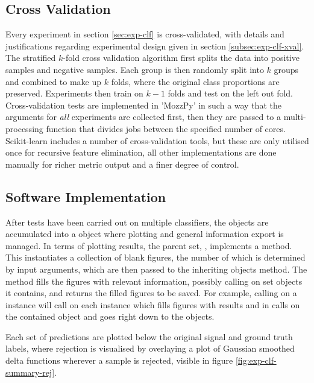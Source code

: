     \subsection{Cross Validation}
    \label{subsec:pl-test-xval}
        Every experiment in section \ref{sec:exp-clf} is cross-validated, with details and justifications regarding experimental design given in section \ref{subsec:exp-clf-xval}. The stratified $k$-fold cross validation algorithm first splits the data into positive samples and negative samples. Each group is then randomly split into $k$ groups and combined to make up $k$ folds, where the original class proportions are preserved. Experiments then train on $k-1$ folds and test on the left out fold. Cross-validation tests are implemented in 'MozzPy' in such a way that the arguments for \textit{all} experiments are collected first, then they are passed to a multi-processing function that divides jobs between the specified number of cores. Scikit-learn includes a number of cross-validation tools, but these are only utilised once for recursive feature elimination, all other implementations are done manually for richer metric output and a finer degree of control.
        
    \subsection{Software Implementation}
    \label{subsec:pl-test-software}
        After tests have been carried out on multiple classifiers, the  objects are accumulated into a  object where plotting and general information export is managed. In terms of plotting results, the parent set, , implements a  method. This instantiates a collection of blank figures, the number of which is determined by input arguments, which are then passed to the inheriting objects  method. The  method fills the figures with relevant information, possibly calling  on set objects it contains, and returns the filled figures to be saved. For example, calling  on a  instance will call  on each  instance which fills figures with results and in calls  on the contained  object and goes right down to the  objects.
        
        Each set of predictions are plotted below the original signal and ground truth labels, where rejection is visualised by overlaying a plot of Gaussian smoothed delta functions wherever a sample is rejected, visible in figure \ref{fig:exp-clf-summary-rej}.